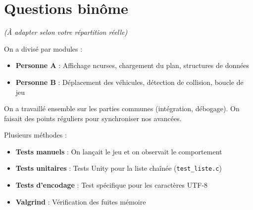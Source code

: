 \documentclass[11pt,a4paper]{article}
\newcommand{\code}[1]{\texttt{\textcolor{accent}{#1}}}
\begin{document}
\section{Questions binôme}

\begin{questionbox}
\end{questionbox}

\begin{reponsebox}
\textit{(À adapter selon votre répartition réelle)}

On a divisé par modules :
\begin{itemize}[noitemsep]
    \item \textbf{Personne A} : Affichage ncurses, chargement du plan, structures de données
    \item \textbf{Personne B} : Déplacement des véhicules, détection de collision, boucle de jeu
\end{itemize}
On a travaillé ensemble sur les parties communes (intégration, débogage). On faisait des points réguliers pour synchroniser nos avancées.
\end{reponsebox}

\vspace{0.3cm}

\begin{questionbox}
\end{questionbox}

\begin{reponsebox}
Plusieurs méthodes :
\begin{itemize}[noitemsep]
    \item[\faIcon{gamepad}] \textbf{Tests manuels} : On lançait le jeu et on observait le comportement
    \item[\faIcon{vial}] \textbf{Tests unitaires} : Tests Unity pour la liste chaînée (\code{test\_liste.c})
    \item[\faIcon{globe}] \textbf{Tests d'encodage} : Test spécifique pour les caractères UTF-8
    \item[\faIcon{memory}] \textbf{Valgrind} : Vérification des fuites mémoire
\end{itemize}
\end{reponsebox}

\vspace{0.3cm}
\end{document}

